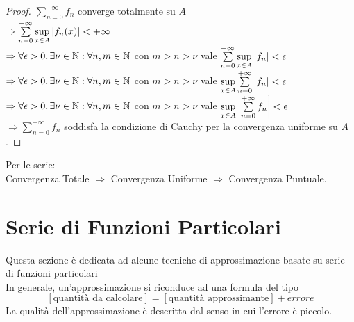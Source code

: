 \begin{proof}
	$\sum\limits_{n=0}^{+\infty}f_n$ converge totalmente su $A$\\
	$\Rightarrow \sum\limits_{n=0}^{+\infty}\sup\limits_{x\in A}\left|f_n(x)\right|<+\infty$\\
	$\Rightarrow \forall\epsilon>0, \exists\nu\in\mathbb{N}: \forall n,m\in\mathbb{N}$ con $m>n>\nu$ vale $\sum\limits_{n=0}^{+\infty}\sup\limits_{x\in A}\left|f_n\right|<\epsilon$\\
	$\Rightarrow \forall\epsilon>0, \exists\nu\in\mathbb{N}: \forall n,m\in\mathbb{N}$ con $m>n>\nu$ vale $\sup\limits_{x\in A}\sum\limits_{n=0}^{+\infty}\left|f_n\right|<\epsilon$\\
	$\Rightarrow \forall\epsilon>0, \exists\nu\in\mathbb{N}: \forall n,m\in\mathbb{N}$ con $m>n>\nu$ vale $\sup\limits_{x\in A}\left|\sum\limits_{n=0}^{+\infty}f_n\right|<\epsilon$\\
	$\Rightarrow \sum\limits_{n=0}^{+\infty}f_n$ soddisfa la condizione di Cauchy per la convergenza uniforme su $A$.
\end{proof}
\observation
Per le serie:\\
Convergenza Totale $\Rightarrow$ Convergenza Uniforme $\Rightarrow$ Convergenza Puntuale.

\section{Serie di Funzioni Particolari}
Questa sezione è dedicata ad alcune tecniche di approssimazione  basate su serie di funzioni particolari\\
In generale, un'approssimazione si riconduce ad una formula del tipo\\
$$\left[\text{quantità da calcolare}\right]=\left[\text{quantità approssimante}\right]+ errore$$
La qualità dell'approssimazione è descritta dal senso in cui l'errore è piccolo.\\
